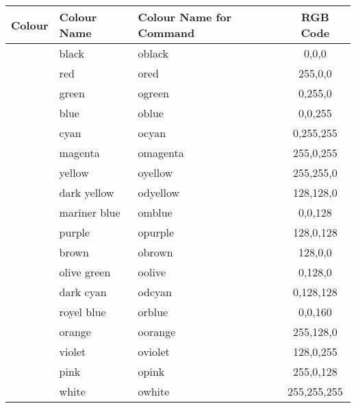 \documentclass[
	a4paper,
	parskip=half,
    pagesize=auto,      		%
    listof=totoc,   		%
    bibliography=totoc,
	11pt
]{scrartcl}
\begin{document}
\begin{table}[H]
\centering
\begin{tabular}{|l|l|l|c|}
\hline
Colour                   & Colour Name   & Colour Name for Command & RGB Code \\ \hline \hline
\cellcolor[RGB]{0,0,0} & black         & oblack                  & 0,0,0    \\ \hline
\cellcolor[RGB]{255,0,0} & red           & ored                    & 255,0,0    \\ \hline
\cellcolor[RGB]{0,255,0} & green         & ogreen                  & 0,255,0    \\ \hline
\cellcolor[RGB]{0,0,255} & blue          & oblue                   & 0,0,255    \\ \hline
\cellcolor[RGB]{0,255,255} & cyan          & ocyan                   & 0,255,255    \\ \hline
\cellcolor[RGB]{255,0,255} & magenta       & omagenta                & 255,0,255    \\ \hline
\cellcolor[RGB]{255,255,0} & yellow        & oyellow                 & 255,255,0    \\ \hline
\cellcolor[RGB]{128,128,0} & dark yellow   & odyellow                & 128,128,0    \\ \hline
\cellcolor[RGB]{0,0,128} & mariner blue  & omblue                  & 0,0,128    \\ \hline
\cellcolor[RGB]{128,0,128} & purple        & opurple                 & 128,0,128    \\ \hline
\cellcolor[RGB]{128,0,0} & brown         & obrown                  & 128,0,0    \\ \hline
\cellcolor[RGB]{0,128,0} & olive green   & oolive                  & 0,128,0    \\ \hline
\cellcolor[RGB]{0,128,128} & dark cyan     & odcyan                  & 0,128,128    \\ \hline
\cellcolor[RGB]{0,0,160} & royel blue    & orblue                  & 0,0,160    \\ \hline
\cellcolor[RGB]{255,128,0} & orange        & oorange                 & 255,128,0   \\ \hline
\cellcolor[RGB]{128,0,255} & violet        & oviolet                 & 128,0,255    \\ \hline
\cellcolor[RGB]{255,0,128} & pink          & opink                   & 255,0,128    \\ \hline
\cellcolor[RGB]{255,255,255} & white         & owhite                  & 255,255,255    \\ \hline

\end{tabular}
\end{table}
\end{document}
